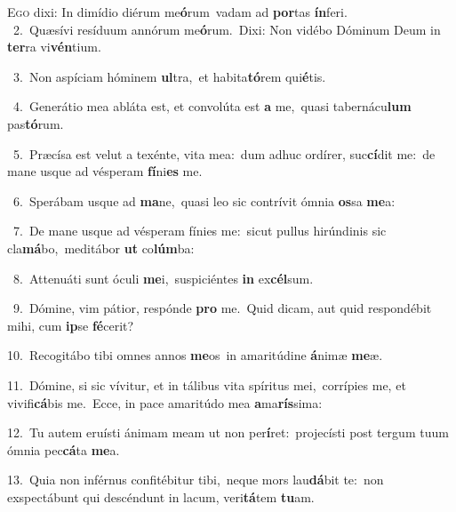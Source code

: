 \lettrine{\initial\textcolor{\initialcolor}{E}}{go} dixi: In dimídio diérum me\-\textbf{ó}\-rum~\star vadam ad \textbf{por}\-tas \textbf{ín}\-feri.\\
{\numbfont\textcolor{\numbcolor}{~2.}}~Quæsívi resíduum annórum me\-\textbf{ó}\-rum.~\star Dixi: Non vidébo Dóminum Deum in \textbf{ter}\-ra vi\-\textbf{vén}\-tium.\par
{\numbfont\textcolor{\numbcolor}{~3.}}~Non aspíciam hóminem \textbf{ul}\-tra,~\star et habita\-\textbf{tó}\-rem qui\-\textbf{é}\-tis.\par
{\numbfont\textcolor{\numbcolor}{~4.}}~Generátio mea abláta est, et convolúta est \textbf{a} me,~\star quasi tabernácu\textbf{lum} pas\-\textbf{tó}\-rum.\par
{\numbfont\textcolor{\numbcolor}{~5.}}~Præcísa est velut a texénte, vita mea:~\dagger dum adhuc ordírer, suc\-\textbf{cí}\-dit me:~\star de mane usque ad vésperam \textbf{fí}\-ni\textbf{es} me.\par
{\numbfont\textcolor{\numbcolor}{~6.}}~Sperábam usque ad \textbf{ma}\-ne,~\star quasi leo sic contrívit ómnia \textbf{os}\-sa \textbf{me}\-a:\par
{\numbfont\textcolor{\numbcolor}{~7.}}~De mane usque ad vésperam fínies me:~\dagger sicut pullus hirúndinis sic cla\-\textbf{má}\-bo,~\star meditábor \textbf{ut} co\-\textbf{lúm}\-ba:\par
{\numbfont\textcolor{\numbcolor}{~8.}}~Attenuáti sunt óculi \textbf{me}\-i,~\star suspiciéntes \textbf{in} ex\-\textbf{cél}\-sum.\par
{\numbfont\textcolor{\numbcolor}{~9.}}~Dómine, vim pátior, respónde \textbf{pro} me.~\star Quid dicam, aut quid respondébit mihi, cum \textbf{ip}\-se \textbf{fé}\-cerit?\par
{\numbfont\textcolor{\numbcolor}{10.}}~Recogitábo tibi omnes annos \textbf{me}\-os~\star in amaritúdine \textbf{á}\-nimæ \textbf{me}\-æ.\par
{\numbfont\textcolor{\numbcolor}{11.}}~Dómine, si sic vívitur, et in tálibus vita spíritus mei,~\dagger corrípies me, et vivifi\-\textbf{cá}\-bis me.~\star Ecce, in pace amaritúdo mea \textbf{a}\-ma\-\textbf{rís}\-sima:\par
{\numbfont\textcolor{\numbcolor}{12.}}~Tu autem eruísti ánimam meam ut non per\-\textbf{í}\-ret:~\star projecísti post tergum tuum ómnia pec\-\textbf{cá}\-ta \textbf{me}\-a.\par
{\numbfont\textcolor{\numbcolor}{13.}}~Quia non inférnus confitébitur tibi,~\dagger neque mors lau\-\textbf{dá}\-bit te:~\star non exspectábunt qui descéndunt in lacum, veri\-\textbf{tá}\-tem \textbf{tu}\-am.\par
